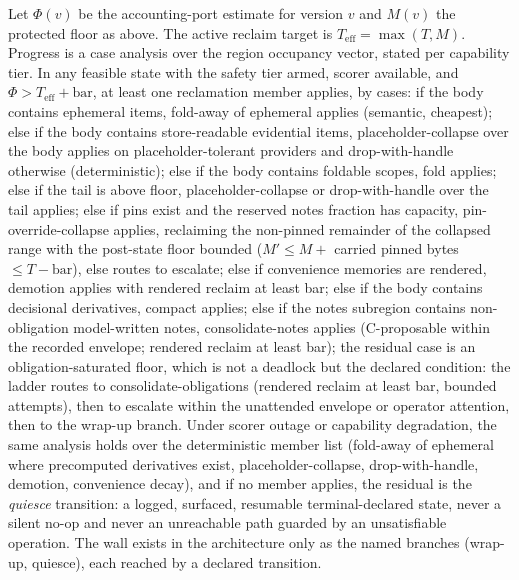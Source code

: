\documentclass[11pt]{article}
\begin{document}
Let $\Phi(v)$ be the accounting-port estimate for version $v$ and $M(v)$ the protected floor as above. The active reclaim target is $T_{\mathrm{eff}} = \max(T, M)$. Progress is a case analysis over the region occupancy vector, stated per capability tier. In any feasible state with the safety tier armed, scorer available, and $\Phi > T_{\mathrm{eff}} + \mathrm{bar}$, at least one reclamation member applies, by cases: if the body contains ephemeral items, fold-away of ephemeral applies (semantic, cheapest); else if the body contains store-readable evidential items, placeholder-collapse over the body applies on placeholder-tolerant providers and drop-with-handle otherwise (deterministic); else if the body contains foldable scopes, fold applies; else if the tail is above floor, placeholder-collapse or drop-with-handle over the tail applies; else if pins exist and the reserved notes fraction has capacity, pin-override-collapse applies, reclaiming the non-pinned remainder of the collapsed range with the post-state floor bounded ($M' \le M +$ carried pinned bytes $\le T - \mathrm{bar}$), else routes to escalate; else if convenience memories are rendered, demotion applies with rendered reclaim at least bar; else if the body contains decisional derivatives, compact applies; else if the notes subregion contains non-obligation model-written notes, consolidate-notes applies (C-proposable within the recorded envelope; rendered reclaim at least bar); the residual case is an obligation-saturated floor, which is not a deadlock but the declared condition: the ladder routes to consolidate-obligations (rendered reclaim at least bar, bounded attempts), then to escalate within the unattended envelope or operator attention, then to the wrap-up branch. Under scorer outage or capability degradation, the same analysis holds over the deterministic member list (fold-away of ephemeral where precomputed derivatives exist, placeholder-collapse, drop-with-handle, demotion, convenience decay), and if no member applies, the residual is the \emph{quiesce} transition: a logged, surfaced, resumable terminal-declared state, never a silent no-op and never an unreachable path guarded by an unsatisfiable operation. The wall exists in the architecture only as the named branches (wrap-up, quiesce), each reached by a declared transition.
\end{document}
